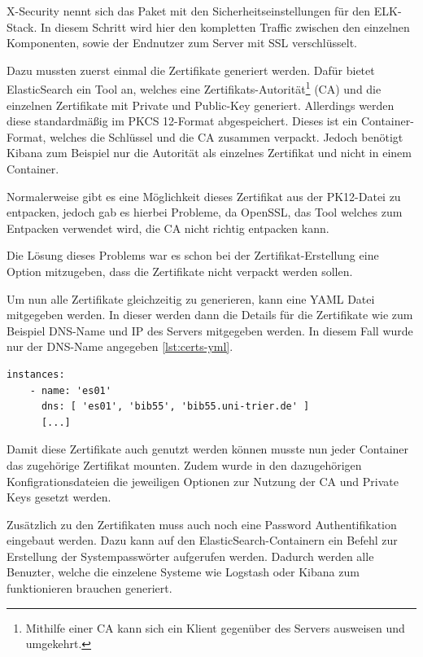 X-Security nennt sich das Paket mit den Sicherheitseinstellungen für den ELK-Stack. In diesem Schritt  wird hier den kompletten Traffic zwischen den einzelnen Komponenten, sowie der Endnutzer zum Server mit SSL verschlüsselt. 

Dazu mussten zuerst einmal die Zertifikate generiert werden. Dafür bietet ElasticSearch ein Tool an, welches eine Zertifikats-Autorität\footnote{Mithilfe einer CA kann sich ein Klient gegenüber des Servers ausweisen und umgekehrt.} (CA) und die einzelnen Zertifikate mit Private und Public-Key generiert. Allerdings werden diese standardmäßig im PKCS 12-Format abgespeichert. Dieses ist ein Container-Format, welches die Schlüssel und die CA zusammen verpackt. Jedoch benötigt Kibana zum Beispiel nur die Autorität als einzelnes Zertifikat und nicht in einem Container.

Normalerweise gibt es eine Möglichkeit dieses Zertifikat aus der PK12-Datei zu entpacken, jedoch gab es hierbei Probleme, da OpenSSL, das Tool welches zum Entpacken verwendet wird, die CA nicht richtig entpacken kann. \cite{nerophon.2018}

Die Lösung dieses Problems war es schon bei der Zertifikat-Erstellung eine Option mitzugeben, dass die Zertifikate nicht verpackt werden sollen. 

Um nun alle Zertifikate gleichzeitig zu generieren, kann eine YAML Datei mitgegeben werden. In dieser werden dann die Details für die Zertifikate wie zum Beispiel DNS-Name und IP des Servers mitgegeben werden. In diesem Fall wurde nur der DNS-Name angegeben \ref{lst:certs-yml}.

\begin{lstlisting}[language=XML, frame=single, label={lst:certs-yml}] 
	instances:
	- name: 'es01'
	  dns: [ 'es01', 'bib55', 'bib55.uni-trier.de' ]
	  [...]
\end{lstlisting}

Damit diese Zertifikate auch genutzt werden können musste nun jeder Container das zugehörige Zertifikat mounten. Zudem wurde in den dazugehörigen Konfigrationsdateien die jeweiligen Optionen zur Nutzung der CA und Private Keys gesetzt werden.

Zusätzlich zu den Zertifikaten muss auch noch eine Password Authentifikation eingebaut werden. Dazu kann auf den ElasticSearch-Containern ein Befehl zur Erstellung der Systempasswörter aufgerufen werden. Dadurch werden alle Benuzter, welche die einzelene Systeme wie Logstash oder Kibana zum funktionieren brauchen generiert.

